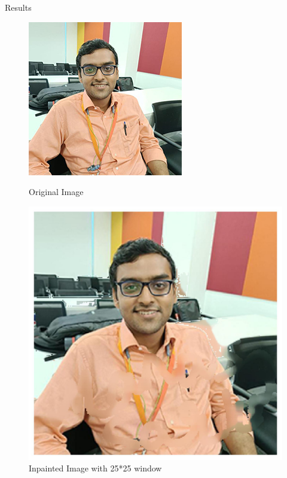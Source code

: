\documentclass{beamer}
\begin{document}
\begin{frame}{Results}
    \begin{figure}[h]
    \centering
    \begin{minipage}{0.45\textwidth}
        \centering
        \includegraphics[width=\linewidth]{Image.jpg} %
        \caption{Original Image}
    \end{minipage}
    \hfill
    \begin{minipage}{0.45\textwidth}
        \centering
        \includegraphics[width=\linewidth]{Image_inpainted_ts_25.jpg} %
        \caption{Inpainted Image with 25*25 window}
    \end{minipage}
\end{figure}
    
\end{frame}
\end{document}
